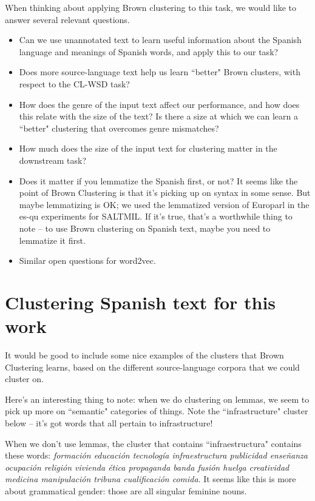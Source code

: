 When thinking about applying Brown clustering to this task, we would like to
answer several relevant questions.

\begin{itemize}
  \item Can we use unannotated text to learn useful information about the
  Spanish language and meanings of Spanish words, and apply this to our task?
  \item Does more source-language text help us learn ``better" Brown clusters,
    with respect to the CL-WSD task?
  \item How does the genre of the input text affect our performance, and how
  does this relate with the size of the text? Is there a size at which we
    can learn a ``better" clustering that overcomes genre mismatches?
  \item How much does the size of the input text for clustering matter in the
  downstream task?
  \item Does it matter if you lemmatize the Spanish first, or not? It seems
    like the point of Brown Clustering is that it's picking up on syntax in
    some sense. But maybe lemmatizing is OK; we used the lemmatized version of
    Europarl in the es-qu experiments for SALTMIL. If it's true, that's a
    worthwhile thing to note -- to use Brown clustering on Spanish text, maybe
    you need to lemmatize it first.
  \item Similar open questions for word2vec.
\end{itemize}


\section{Clustering Spanish text for this work}

It would be good to include some nice examples of the clusters that Brown
Clustering learns, based on the different source-language corpora that we could
cluster on.

Here's an interesting thing to note: when we do clustering on lemmas, we seem
to pick up more on ``semantic" categories of things. Note the ``infrastructure"
cluster below -- it's got words that all pertain to infrastructure!

When we don't use lemmas, the cluster that contains ``infraestructura" contains
these words: \emph{formación educación tecnología infraestructura publicidad
enseñanza ocupación religión vivienda ética propaganda banda fusión huelga
creatividad medicina manipulación tribuna cualificación comida}. It seems like
this is more about grammatical gender: those are all singular feminine nouns.


